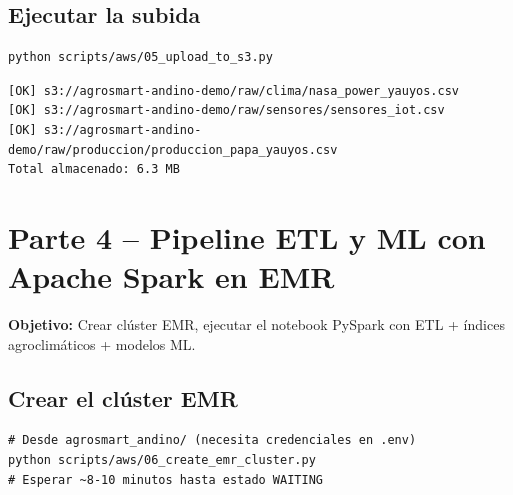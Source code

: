 \documentclass[11pt,a4paper]{article}
\begin{document}
\subsection{Ejecutar la subida}

\begin{localbox}
\begin{lstlisting}[style=bash]
python scripts/aws/05_upload_to_s3.py
\end{lstlisting}
\end{localbox}

\begin{okbox}[]
\begin{lstlisting}
[OK] s3://agrosmart-andino-demo/raw/clima/nasa_power_yauyos.csv
[OK] s3://agrosmart-andino-demo/raw/sensores/sensores_iot.csv
[OK] s3://agrosmart-andino-demo/raw/produccion/produccion_papa_yauyos.csv
Total almacenado: 6.3 MB
\end{lstlisting}
\end{okbox}

\section{Parte 4 -- Pipeline ETL y ML con Apache Spark en EMR}

\textbf{Objetivo:} Crear cl\'uster EMR, ejecutar el notebook PySpark con
ETL + \'indices agroclim\'aticos + modelos ML.

\subsection{Crear el cl\'uster EMR}

\begin{awsbox}
\begin{lstlisting}[style=bash]
# Desde agrosmart_andino/ (necesita credenciales en .env)
python scripts/aws/06_create_emr_cluster.py
# Esperar ~8-10 minutos hasta estado WAITING
\end{lstlisting}
\end{awsbox}
\end{document}
